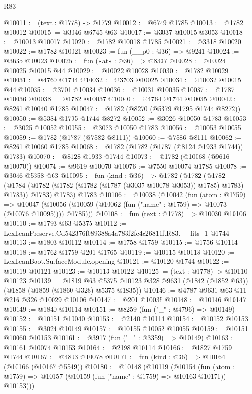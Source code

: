 \begin{lexlean}{R83}
\begin{coremodule}
@10011 := (text : @1778) -> @1779
@10012 := @6749 @1785
@10013 := @1782 @10012
@10015 := @3046 @6745 @63
@10017 := @3037 @10015 @3053
@10018 := @10013 @10017
@10020 := @1782 @10018 @1785
@10021 := @3318 @10020
@10022 := @1782 @10021
@10023 := fun (__p0 : @36) => @9241
@10024 := @3635 @10023
@10025 := fun («at» : @36) => @8337
@10028 := @10024 @10025 @10015 @44
@10029 := @10022 @10028
@10030 := @1782 @10029
@10031 := @4760 @1744
@10032 := @3703 @10025
@10034 := @10032 @10015 @44
@10035 := @3701 @10034
@10036 := @10031 @10035
@10037 := @1787 @10036
@10038 := @1782 @10037
@10040 := @4764 @1744 @10035
@10042 := @8261 @10040 @1785
@10047 := @1782 (@8270 (@5379 @1795 @1744 @8272))
@10050 := @5384 @1795 @1744 @8272
@10052 := @3026 @10050 @1783
@10053 := @3025 @10052
@10055 := @3033 @10050 @1783
@10056 := @10053 @10055
@10059 := @1782 (@1787 (@7582 @8111))
@10060 := @7586 @8111
@10062 := @8261 @10060 @1785
@10068 := @1782 (@1782 (@1787 (@8124 @1933 @1744)) @1783)
@10070 := @8128 @1933 @1744
@10073 := @1782 (@10068 (@9616 @10070))
@10074 := @9619 @10070
@10076 := @7550 @10074 @1785
@10078 := @3046 @5358 @63
@10095 := fun (kind : @36) =>
  @1782
    (@1782
      (@1782 (@1784 (@1782 (@1782 (@1782 (@1787 (@3037 @10078 @3053)) @1785) @1783) @1783)) @1783)
      @1783)
    @1783
@10106 := @10038
    (@10042
      (fun (atom : @1759) =>
      @10047 (@10056 (@10059 (@10062 (fun ("name" : @1759) => @10073 (@10076 @10095)))) @1785)))
@10108 := fun (text : @1778) => @10030 @10106
@10110 := @1793 @63 @5375
@10112 := LexLeanPreserve.Cd542376f089388a4a783f2fc4c26811f.R83.__fits_1 @1744
@10113 := @1803 @10112
@10114 := @1758 @1759
@10115 := @1756 @10114
@10118 := @1762 @1759 @201 @1765
@10119 := @10115 @10118
@10120 := LexLeanBoot.SurfaceModule.opening
@10121 := @10120 @1744
@10122 := @10119 @10121
@10123 := @10113 @10122
@10125 := (text : @1778) -> @10110 @10123
@10139 := @1819
    @63
    @5375
    @10123
    @328
    @9631
    (@1842 (@1852 @63))
    (@1858 (@1859 (@1860 @328) @5375 @1835))
@10146 := @4787 @9631 @63 @11 @216 @326 @10029 @10106
@10147 := @201 @10035
@10148 := @10146 @10147
@10149 := @1840 @10114
@10151 := @8259 (fun ("_" : @4796) => @10149)
@10152 := @10151 @10040
@10153 := @2140 @10114
@10154 := @10152 @10153
@10155 := @3024 @10149
@10157 := @10155 @10052 @10055
@10159 := @10151 @10060 @10153
@10161 := @3917 (fun ("_" : @3359) => @10149)
@10163 := @10161 @10074 @10153
@10164 := @2198 @10114
@10166 := @1827 @1759 @1744
@10167 := @4803 @10078
@10171 := fun (kind : @36) => @10164 (@10166 (@10167 @5549))
@10180 := @10148
    (@10119
      (@10154
        (fun (atom : @1759) => @10157 (@10159 (fun ("name" : @1759) => @10163 @10171)) @10153)))

\end{coremodule}
\end{lexlean}

